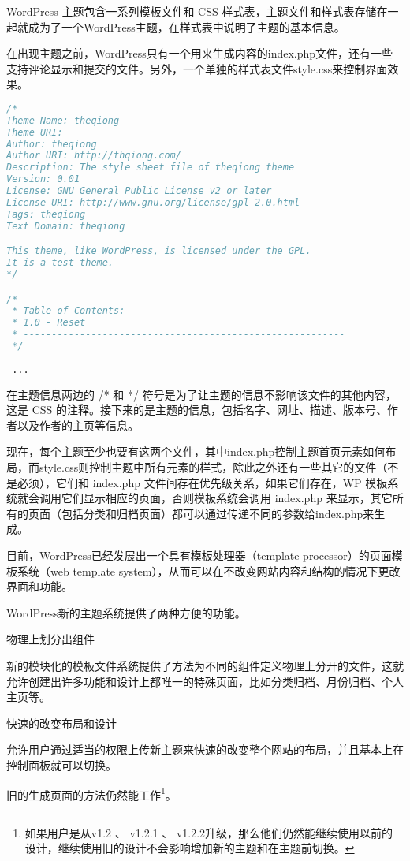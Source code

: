 WordPress 主题包含一系列模板文件和 CSS 样式表，主题文件和样式表存储在一起就成为了一个WordPress主题，在样式表中说明了主题的基本信息\cite{wp_style_css}。

在出现主题之前，WordPress只有一个用来生成内容的index.php文件，还有一些支持评论显示和提交的文件。另外，一个单独的样式表文件style.css来控制界面效果。

\begin{lstlisting}[language=CSS]
/*
Theme Name: theqiong
Theme URI: 
Author: theqiong
Author URI: http://thqiong.com/
Description: The style sheet file of theqiong theme
Version: 0.01
License: GNU General Public License v2 or later
License URI: http://www.gnu.org/license/gpl-2.0.html
Tags: theqiong
Text Domain: theqiong

This theme, like WordPress, is licensed under the GPL.
It is a test theme.
*/

/*
 * Table of Contents:
 * 1.0 - Reset
 * ---------------------------------------------------------
 */
 
 ...
\end{lstlisting}

在主题信息两边的 /* 和 */ 符号是为了让主题的信息不影响该文件的其他内容，这是 CSS 的注释。接下来的是主题的信息，包括名字、网址、描述、版本号、作者以及作者的主页等信息。

现在，每个主题至少也要有这两个文件，其中index.php控制主题首页元素如何布局，而style.css则控制主题中所有元素的样式，除此之外还有一些其它的文件（不是必须），它们和 index.php 文件间存在优先级关系，如果它们存在，WP 模板系统就会调用它们显示相应的页面，否则模板系统会调用 index.php 来显示，其它所有的页面（包括分类和归档页面）都可以通过传递不同的参数给index.php来生成。



目前，WordPress已经发展出一个具有模板处理器（template processor）的页面模板系统（web template system），从而可以在不改变网站内容和结构的情况下更改界面和功能。

WordPress新的主题系统提供了两种方便的功能。

\begin{compactitem}
\item 物理上划分出组件

新的模块化的模板文件系统提供了方法为不同的组件定义物理上分开的文件，这就允许创建出许多功能和设计上都唯一的特殊页面，比如分类归档、月份归档、个人主页等。

\item 快速的改变布局和设计

允许用户通过适当的权限上传新主题来快速的改变整个网站的布局，并且基本上在控制面板就可以切换。


\item 旧的生成页面的方法仍然能工作\footnote{如果用户是从v1.2 、 v1.2.1 、 v1.2.2升级，那么他们仍然能继续使用以前的设计，继续使用旧的设计不会影响增加新的主题和在主题前切换。}。

\end{compactitem}

